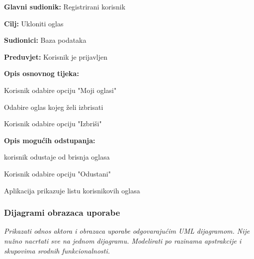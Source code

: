 \noindent {}
\begin{packed_item}
	
	\item \textbf{Glavni sudionik: }Registrirani korisnik
	\item  \textbf{Cilj:} Ukloniti oglas
	\item  \textbf{Sudionici:} Baza podataka
	\item  \textbf{Preduvjet:} Korisnik je prijavljen
	\item  \textbf{Opis osnovnog tijeka:}
	
	\item[] \begin{packed_enum}
		
		\item Korisnik odabire opciju "Moji oglasi"
		\item Odabire oglas kojeg želi izbrisati
		\item Korisnik odabire opciju "Izbriši"
	\end{packed_enum}
	
	\item  \textbf{Opis mogućih odstupanja:}
	
	\item[] \begin{packed_item}
		
		\item[3.a] korisnik odustaje od brisnja oglasa
		\item[] \begin{packed_enum}
			
			\item Korisnik odabire opciju "Odustani"
			\item Aplikacija prikazuje listu korisnikovih oglasa
			
		\end{packed_enum}
		
		
	\end{packed_item}
\end{packed_item}



\subsubsection{Dijagrami obrazaca uporabe}

\textit{Prikazati odnos aktora i obrazaca uporabe odgovarajućim UML dijagramom. Nije nužno nacrtati sve na jednom dijagramu. Modelirati po razinama apstrakcije i skupovima srodnih funkcionalnosti.}
\eject		

